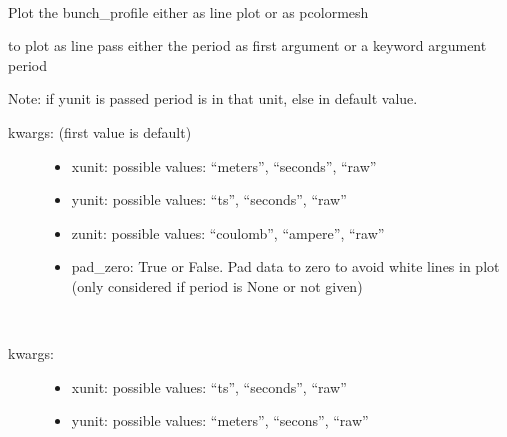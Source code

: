\documentclass[letterpaper,10pt,openany,oneside,english]{sphinxmanual}
\begin{document}
\begin{fulllineitems}
\begin{fulllineitems}
\label{\detokenize{plots:plots.SimplePlotter.bunch_profile}}~
\begin{DUlineblock}{0em}
\item[] Plot the bunch\_profile either as line plot or as pcolormesh  
\item[] to plot as line pass either the period as first argument or a keyword argument period  
\item[] Note: if yunit is passed period is in that unit, else in default value.  
\end{DUlineblock}
\begin{description}
\item[{kwargs: (first value is default)  }] \leavevmode\begin{itemize}
\item {} 
xunit: possible values: “meters”, “seconds”, “raw”

\item {} 
yunit: possible values: “ts”, “seconds”, “raw”

\item {} 
zunit: possible values: “coulomb”, “ampere”, “raw”

\item {} 
pad\_zero: True or False. Pad data to zero to avoid white lines in plot (only considered if period is None or not given)

\end{itemize}

\end{description}

\end{fulllineitems}


\begin{fulllineitems}
\label{\detokenize{plots:plots.SimplePlotter.bunch_length}}~\begin{description}
\item[{kwargs:  }] \leavevmode\begin{itemize}
\item {} 
xunit: possible values: “ts”, “seconds”, “raw”

\item {} 
yunit: possible values: “meters”, “secons”, “raw”


\end{itemize}
\end{description}
\end{fulllineitems}
\end{fulllineitems}
\end{document}

